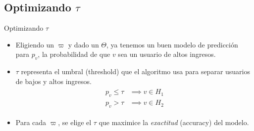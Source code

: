 \documentclass{beamer}
\begin{document}
\subsection{Optimizando $\tau$}

\begin{frame}{Optimizando $\tau$}
	\begin{itemize}
		\item Eligiendo un $\varpi$ y dado un $\Theta$, ya tenemos un buen modelo de predicción para $p_v$, la probabilidad de que $v$ sea un usuario de altos ingresos.
		\item $\tau$ representa el umbral (threshold) que el algoritmo usa para separar usuarios de bajos y altos ingresos.
			\begin{gather*}
				\begin{aligned}
					p_v \leq \tau &\implies v \in H_1 \\
					p_v >    \tau &\implies v \in H_2
				\end{aligned}
			\end{gather*}
		\item Para cada $\varpi$, se elige el $\tau$ que maximice la \emph{exactitud} (accuracy) del modelo.
	\end{itemize}
\end{frame}
\end{document}
